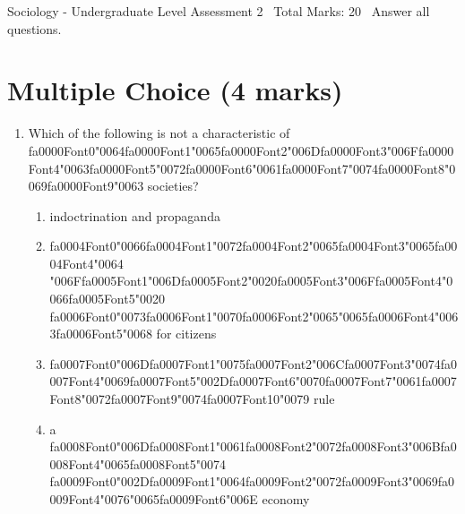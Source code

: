 \documentclass[12pt]{article}
\begin{document}
\begin{center}
Sociology - Undergraduate Level Assessment 2 \
Total Marks: 20 \
Answer all questions.
\end{center}

\section*{Multiple Choice (4 marks)}
\begin{enumerate}[label=\arabic*.]
\item Which of the following is not a characteristic of {\csname fa0000Font0\endcsname\char"0064}{\csname fa0000Font1\endcsname\char"0065}{\csname fa0000Font2\endcsname\char"006D}{\csname fa0000Font3\endcsname\char"006F}{\csname fa0000Font4\endcsname\char"0063}{\csname fa0000Font5\endcsname\char"0072}{\csname fa0000Font6\endcsname\char"0061}{\csname fa0000Font7\endcsname\char"0074}{\csname fa0000Font8\endcsname\char"0069}{\csname fa0000Font9\endcsname\char"0063} societies?
\begin{enumerate}[label=(\alph*)]
    \item indoctrination and propaganda
    \item {\csname fa0004Font0\endcsname\char"0066}{\csname fa0004Font1\endcsname\char"0072}{\csname fa0004Font2\endcsname\char"0065}{\csname fa0004Font3\endcsname\char"0065}{\csname fa0004Font4\endcsname\char"0064} {\char"006F}{\csname fa0005Font1\endcsname\char"006D}{\csname fa0005Font2\endcsname\char"0020}{\csname fa0005Font3\endcsname\char"006F}{\csname fa0005Font4\endcsname\char"0066}{\csname fa0005Font5\endcsname\char"0020} {\csname fa0006Font0\endcsname\char"0073}{\csname fa0006Font1\endcsname\char"0070}{\csname fa0006Font2\endcsname\char"0065}{\char"0065}{\csname fa0006Font4\endcsname\char"0063}{\csname fa0006Font5\endcsname\char"0068} for citizens
    \item {\csname fa0007Font0\endcsname\char"006D}{\csname fa0007Font1\endcsname\char"0075}{\csname fa0007Font2\endcsname\char"006C}{\csname fa0007Font3\endcsname\char"0074}{\csname fa0007Font4\endcsname\char"0069}{\csname fa0007Font5\endcsname\char"002D}{\csname fa0007Font6\endcsname\char"0070}{\csname fa0007Font7\endcsname\char"0061}{\csname fa0007Font8\endcsname\char"0072}{\csname fa0007Font9\endcsname\char"0074}{\csname fa0007Font10\endcsname\char"0079} rule
    \item a {\csname fa0008Font0\endcsname\char"006D}{\csname fa0008Font1\endcsname\char"0061}{\csname fa0008Font2\endcsname\char"0072}{\csname fa0008Font3\endcsname\char"006B}{\csname fa0008Font4\endcsname\char"0065}{\csname fa0008Font5\endcsname\char"0074} {\csname fa0009Font0\endcsname\char"002D}{\csname fa0009Font1\endcsname\char"0064}{\csname fa0009Font2\endcsname\char"0072}{\csname fa0009Font3\endcsname\char"0069}{\csname fa0009Font4\endcsname\char"0076}{\char"0065}{\csname fa0009Font6\endcsname\char"006E} economy

\end{enumerate}
\end{enumerate}
\end{document}
